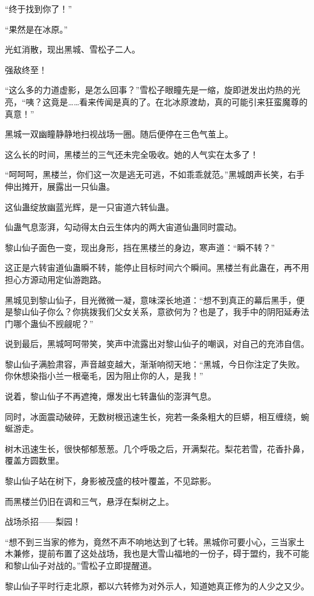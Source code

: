 \begin{this_body}
“终于找到你了！”

“果然是在冰原。”

光虹消散，现出黑城、雪松子二人。

强敌终至！

“这么多的力道虚影，是怎么回事？”雪松子眼瞳先是一缩，旋即迸发出灼热的光亮，“咦？这竟是……看来传闻是真的了。在北冰原渡劫，真的可能引来狂蛮魔尊的真意！”

黑城一双幽瞳静静地扫视战场一圈。随后便停在三色气茧上。

这么长的时间，黑楼兰的三气还未完全吸收。她的人气实在太多了！

“呵呵呵，黑楼兰，你们这一次是逃无可逃，不如乖乖就范。”黑城朗声长笑，右手伸出摊开，展露出一只仙蛊。

这仙蛊绽放幽蓝光辉，是一只宙道六转仙蛊。

仙蛊气息澎湃，勾动得太白云生体内的两大宙道仙蛊同时震动。

黎山仙子面色一变，现出身形，挡在黑楼兰的身边，寒声道：“瞬不转？”

这正是六转宙道仙蛊瞬不转，能停止目标时间六个瞬间。黑楼兰有此蛊在，再不用担心方源动用定仙游跑路。

黑城见到黎山仙子，目光微微一凝，意味深长地道：“想不到真正的幕后黑手，便是黎山仙子你么？你挑拨我们父女关系，意欲何为？也是了，我手中的阴阳延寿法门哪个蛊仙不觊觎呢？”

说到最后，黑城呵呵带笑，笑声中流露出对黎山仙子的嘲讽，对自己的充沛自信。

黎山仙子满脸肃容，声音越变越大，渐渐响彻天地：“黑城，今日你注定了失败。你休想染指小兰一根毫毛，因为阻止你的人，是我！”

说着，黎山仙子不再遮掩，爆发出七转蛊仙的澎湃气息。

同时，冰面震动破碎，无数树根迅速生长，宛若一条条粗大的巨蟒，相互缠绕，蜿蜒游走。

树木迅速生长，很快郁郁葱葱。几个呼吸之后，开满梨花。梨花若雪，花香扑鼻，覆盖方圆数里。

黎山仙子站在树下，身影被茂盛的枝叶覆盖，不见踪影。

而黑楼兰仍旧在调和三气，悬浮在梨树之上。

战场杀招——梨园！

“想不到三当家的修为，竟然不声不响地达到了七转。黑城你可要小心，三当家土木兼修，提前布置了这处战场，我也是大雪山福地的一份子，碍于盟约，我不可能和黎山仙子对战的。”雪松子立即提醒道。

黎山仙子平时行走北原，都以六转修为对外示人，知道她真正修为的人少之又少。


\end{this_body}
